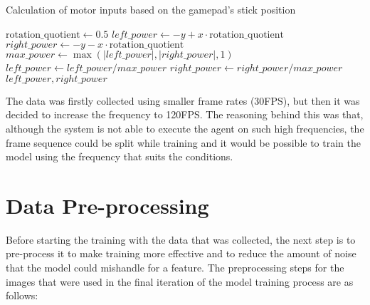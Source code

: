 \begin{algorithm}
  \caption{Calculation of motor inputs based on the gamepad's stick position}
  \begin{algorithmic}[1]
    \State $\text{rotation\_quotient} \gets 0.5$
    \State $left\_power \gets -y + x \cdot \text{rotation\_quotient}$
    \State $right\_power \gets -y - x \cdot \text{rotation\_quotient}$
    \State $max\_power \gets \max\left( \left|left\_power\right|, \left|right\_power\right|, 1 \right)$
    \State $left\_power \gets left\_power / max\_power$
    \State $right\_power \gets right\_power / max\_power$
    \State \Return $left\_power, right\_power$
    \EndFunction
  \end{algorithmic}
  \label{alg:motor_inputs}
\end{algorithm}

The data was firstly collected using smaller frame rates (30FPS), but then it was decided to increase the frequency to 120FPS. The reasoning behind this was that, although the system is not able to execute the agent on such high frequencies, the frame sequence could be split while training and it would be possible to train the model using the frequency that suits the conditions.

\section{Data Pre-processing}

Before starting the training with the data that was collected, the next step is to pre-process it to make training more effective and to reduce the amount of noise that the model could mishandle for a feature. The preprocessing steps for the images that were used in the final iteration of the model training process are as follows:

